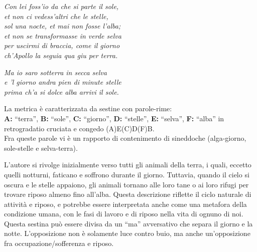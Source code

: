 \documentclass[a4paper]{article}
\newcommand*\circled[1]{\tikz[baseline=(char.base)]{
            \node[shape=circle,draw,inner sep=2pt] (char) {#1};}}
\newcommand{\quotes}[1]{``#1''}
\newcommand\hr{\par\vspace{-.5\ht\strutbox}\noindent\hrulefill\par\vspace{0.15cm}}
\begin{document}
\begin{center}
    \textit{Con lei foss'io da che si parte il sole,} \\
    \textit{et non ci vedess'altri che le stelle,} \\
    \textit{sol una nocte, et mai non fosse l'alba;} \\
    \textit{et non se transformasse in verde selva} \\
    \textit{per uscirmi di braccia, come il giorno} \\
    \textit{ch'Apollo la seguia qua giu per terra.}
\end{center}
\begin{center}
    \textit{Ma io saro sotterra in secca selva} \\
    \textit{e 'l giorno andra pien di minute stelle} \\
    \textit{prima ch'a si dolce alba arrivi il sole. }
\end{center}

\pagebreak
La metrica è caratterizzata da sestine con parole-rime: \\
\textbf{A:} \quotes{terra}, \textbf{B:} \quotes{sole},
\textbf{C:} \quotes{giorno}, \textbf{D:} \quotes{stelle},
\textbf{E:} \quotes{selva}, \textbf{F:} \quotes{alba}
in retrogradatio cruciata e congedo (A)E(C)D(F)B. \\
Fra queste parole vi è un rapporto di contenimento di sineddoche (alga-giorno, sole-stelle e selva-terra).


\hr

\circled{1} L'autore si rivolge inizialmente verso tutti gli animali della terra,
i quali, eccetto quelli notturni, faticano e soffrono durante il giorno.
Tuttavia, quando il cielo si oscura e le stelle appaiono,
gli animali tornano alle loro tane o ai loro rifugi per trovare
riposo almeno fino all'alba.
Questa descrizione riflette il ciclo naturale di attività e riposo,
e potrebbe essere interpretata anche come una metafora della condizione umana,
con le fasi di lavoro e di riposo nella vita di ognuno di noi. \\
Questa sestina può essere divisa da un \quotes{ma} avversativo che separa il giorno e la notte.
L'opposizione non è solamente luce contro buio, ma anche un'opposizione fra occupazione/sofferenza e riposo.
\end{document}
